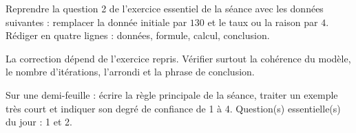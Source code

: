 
\begin{homework}Reprendre la question 2 de l'exercice essentiel de la séance avec les données suivantes : remplacer la donnée initiale par $130$ et le taux ou la raison par $4$. Rédiger en quatre lignes : données, formule, calcul, conclusion.\end{homework}
\begin{solution}La correction dépend de l'exercice repris. Vérifier surtout la cohérence du modèle, le nombre d'itérations, l'arrondi et la phrase de conclusion.\end{solution}

\begin{exitticket}[3 minutes]Sur une demi-feuille : écrire la règle principale de la séance, traiter un exemple très court et indiquer son degré de confiance de 1 à 4. Question(s) essentielle(s) du jour : 1 et 2.\end{exitticket}

